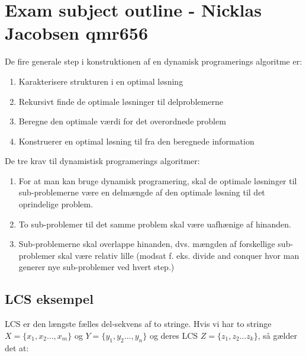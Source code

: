 \documentclass[12pt]{article}
\begin{document}
\section*{Exam subject outline - Nicklas Jacobsen qmr656}
De fire generale step i konstruktionen af en dynamisk programerings algoritme er:
\begin{enumerate}
  \item{Karakterisere strukturen i en optimal løsning}
  \item{Rekursivt finde de optimale løsninger til delproblemerne}
  \item{Beregne den optimale værdi for det overordnede problem}
  \item{Konstruerer en optimal løsning til fra den beregnede information}
\end{enumerate}
De tre krav til dynamistisk programerings algoritmer:
\begin{enumerate}
  \item{For at man kan bruge dynamisk programering, skal de optimale løsninger til sub-problemerne være en delmængde af den optimale løsning til det oprindelige problem.}
  \item{To sub-problemer til det samme problem skal være uafhænige af hinanden.}
  \item{Sub-problemerne skal overlappe hinanden, dvs. mængden af forskellige sub-problemer skal være relativ lille (modsat f. eks. divide and conquer hvor man generer nye sub-problemer ved hvert step.)}
\end{enumerate}
\subsection*{LCS eksempel}
LCS er den længste fælles del-sekvens af to stringe.
Hvis vi har to stringe $X = \{x_1, x_2...,x_m\}$ og $Y=\{y_1, y_2...,y_n\}$ og deres LCS $Z=\{z_1, z_2...z_k\}$, så gælder det at:
\end{document}
